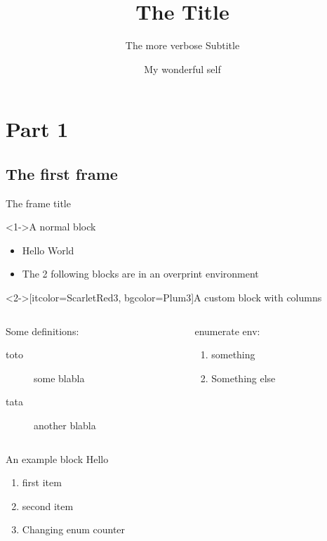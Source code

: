 \documentclass[presentation, aspectratio=169]{beamer}
\author{My wonderful self}
\date{\mydate}
\title{The Title}
\subtitle{The more verbose Subtitle}
\begin{document}
\maketitle
\section{Part 1}
\label{sec:part1}

\subsection{The first frame}
\label{sec:first_frame}

\begin{frame}{The frame title}

\begin{block}<1->{A normal block}
\begin{itemize}
\item Hello World
\item The 2 following blocks are in an overprint environment
\end{itemize}
\end{block}

\begin{overprint}

\begin{customblock}<2->[itcolor=ScarletRed3, bgcolor=Plum3]{A custom block with columns}
\begin{columns}
\begin{column}{0.6\columnwidth}
Some definitions:
\begin{description}
\item[{toto}] some blabla
\item[{tata}] another blabla
\end{description}
\end{column}

\begin{column}{0.3\columnwidth}
enumerate env:
\begin{enumerate}
\item something
\item Something else
\end{enumerate}
\end{column}
\end{columns}
\end{customblock}


\begin{exampleblock}{An example block}
Hello
\end{exampleblock}
\end{overprint}

\begin{enumerate}
\item first item
\item second item
\setcounter{enumi}{5}
\item Changing enum counter
\end{enumerate}
\end{frame}
\end{document}
